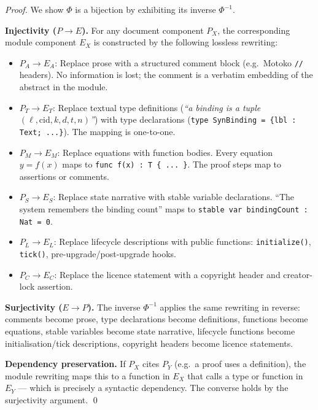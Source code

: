 \documentclass[12pt]{article}
\begin{document}
\begin{proof}
  We show $\Phi$ is a bijection by exhibiting its inverse $\Phi^{-1}$.

  \medskip\noindent
  \textbf{Injectivity ($P \to E$).}  For any document component $P_X$, the
  corresponding module component $E_X$ is constructed by the following lossless
  rewriting:
  \begin{itemize}[leftmargin=*]
    \item $P_A \to E_A$: Replace prose with a structured comment block (e.g.\
      Motoko \texttt{//} headers).  No information is lost; the comment is a
      verbatim embedding of the abstract in the module.
    \item $P_T \to E_T$: Replace textual type definitions (\textit{``a
      binding is a tuple $(\ell, \mathrm{cid}, k, d, t, n)$''}) with type
      declarations (\texttt{type SynBinding = \{lbl : Text; ...\}}).  The
      mapping is one-to-one.
    \item $P_M \to E_M$: Replace equations with function bodies.  Every
      equation $y = f(x)$ maps to \texttt{func f(x) : T \{ ... \}}.  The
      proof steps map to assertions or comments.
    \item $P_S \to E_S$: Replace state narrative with stable variable
      declarations.  ``The system remembers the binding count'' maps to
      \texttt{stable var bindingCount : Nat = 0}.
    \item $P_L \to E_L$: Replace lifecycle descriptions with public functions:
      \texttt{initialize()}, \texttt{tick()}, pre-upgrade/post-upgrade hooks.
    \item $P_C \to E_C$: Replace the licence statement with a copyright header
      and creator-lock assertion.
  \end{itemize}

  \medskip\noindent
  \textbf{Surjectivity ($E \to P$).}  The inverse $\Phi^{-1}$ applies the same
  rewriting in reverse: comments become prose, type declarations become
  definitions, functions become equations, stable variables become state
  narrative, lifecycle functions become initialisation/tick descriptions,
  copyright headers become licence statements.

  \medskip\noindent
  \textbf{Dependency preservation.}  If $P_X$ cites $P_Y$ (e.g.\ a proof uses
  a definition), the module rewriting maps this to a function in $E_X$ that
  calls a type or function in $E_Y$ — which is precisely a syntactic dependency.
  The converse holds by the surjectivity argument. \qed
\end{proof}
\end{document}
